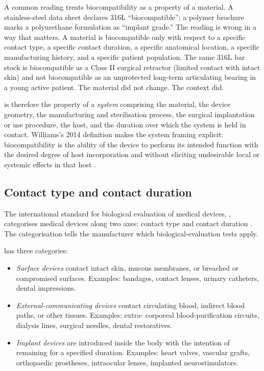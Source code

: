 A common reading treats biocompatibility as a property of a
material. A stainless-steel data sheet declares 316L
``biocompatible''; a polymer brochure marks a polyurethane formulation
as ``implant grade.'' The reading is wrong in a way that matters.
A material is biocompatible only with respect to a specific contact
type, a specific contact duration, a specific anatomical location,
a specific manufacturing history, and a specific patient population.
The same 316L bar stock is biocompatible as a Class II surgical
retractor (limited contact with intact skin) and not biocompatible
as an unprotected long-term articulating bearing in a young active
patient. The material did not change. The context did.

 is therefore the property of a
\emph{system} comprising the material, the device geometry, the
manufacturing and sterilisation process, the surgical implantation
or use procedure, the host, and the duration over which the system
is held in contact. Williams's 2014 definition makes the system
framing explicit: biocompatibility is the ability of the device to
perform its intended function with the desired degree of host
incorporation and without eliciting undesirable local or systemic
effects in that host
\cite{text:v6c12-williams-biocompatibility-2014}.

\subsection{Contact type and contact duration}

The international standard for biological evaluation of medical
devices, , categorises medical devices along
two axes: contact type and contact duration
\cite{std:v6c12-iso-10993-1-2018}. The categorisation tells the
manufacturer which biological-evaluation tests apply.

 has three categories:

\begin{itemize}[leftmargin=*]
\item \emph{Surface devices} contact intact skin, mucous membranes,
  or breached or compromised surfaces. Examples: bandages, contact
  lenses, urinary catheters, dental impressions.
\item \emph{External-communicating devices} contact circulating
  blood, indirect blood paths, or other tissues. Examples: extra-
  corporeal blood-purification circuits, dialysis lines, surgical
  needles, dental restoratives.
\item \emph{Implant devices} are introduced inside the body with the
  intention of remaining for a specified duration. Examples: heart
  valves, vascular grafts, orthopaedic prostheses, intraocular
  lenses, implanted neurostimulators.
\end{itemize}

